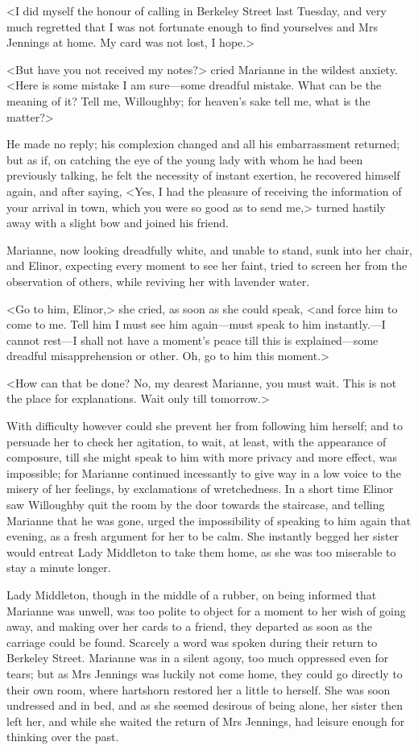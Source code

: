 <I did myself the honour of calling in Berkeley Street last Tuesday, and very much regretted that I was not fortunate enough to find yourselves and Mrs Jennings at home. My card was not lost, I hope.>

<But have you not received my notes?> cried Marianne in the wildest anxiety. <Here is some mistake I am sure—some dreadful mistake. What can be the meaning of it? Tell me, Willoughby; for heaven's sake tell me, what is the matter?>

He made no reply; his complexion changed and all his embarrassment returned; but as if, on catching the eye of the young lady with whom he had been previously talking, he felt the necessity of instant exertion, he recovered himself again, and after saying, <Yes, I had the pleasure of receiving the information of your arrival in town, which you were so good as to send me,> turned hastily away with a slight bow and joined his friend.

Marianne, now looking dreadfully white, and unable to stand, sunk into her chair, and Elinor, expecting every moment to see her faint, tried to screen her from the observation of others, while reviving her with lavender water.

<Go to him, Elinor,> she cried, as soon as she could speak, <and force him to come to me. Tell him I must see him again—must speak to him instantly.—I cannot rest—I shall not have a moment's peace till this is explained—some dreadful misapprehension or other. Oh, go to him this moment.>

<How can that be done? No, my dearest Marianne, you must wait. This is not the place for explanations. Wait only till tomorrow.>

With difficulty however could she prevent her from following him herself; and to persuade her to check her agitation, to wait, at least, with the appearance of composure, till she might speak to him with more privacy and more effect, was impossible; for Marianne continued incessantly to give way in a low voice to the misery of her feelings, by exclamations of wretchedness. In a short time Elinor saw Willoughby quit the room by the door towards the staircase, and telling Marianne that he was gone, urged the impossibility of speaking to him again that evening, as a fresh argument for her to be calm. She instantly begged her sister would entreat Lady Middleton to take them home, as she was too miserable to stay a minute longer.

Lady Middleton, though in the middle of a rubber, on being informed that Marianne was unwell, was too polite to object for a moment to her wish of going away, and making over her cards to a friend, they departed as soon as the carriage could be found. Scarcely a word was spoken during their return to Berkeley Street. Marianne was in a silent agony, too much oppressed even for tears; but as Mrs Jennings was luckily not come home, they could go directly to their own room, where hartshorn restored her a little to herself. She was soon undressed and in bed, and as she seemed desirous of being alone, her sister then left her, and while she waited the return of Mrs Jennings, had leisure enough for thinking over the past.


